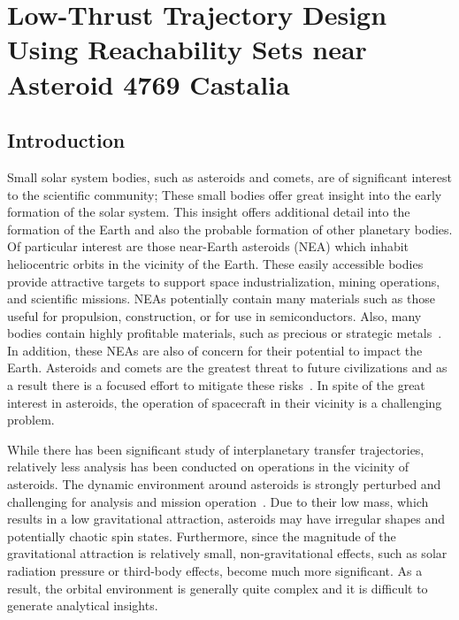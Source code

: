 
\chapter{Low-Thrust Trajectory Design Using Reachability Sets near Asteroid 4769 Castalia}



\section{Introduction}\label{sec:introduction}

Small solar system bodies, such as asteroids and comets, are of significant interest to the scientific community; These small bodies offer great insight into the early formation of the solar system.
This insight offers additional detail into the formation of the Earth and also the probable formation of other planetary bodies.
Of particular interest are those near-Earth asteroids (NEA) which inhabit heliocentric orbits in the vicinity of the Earth.
These easily accessible bodies provide attractive targets to support space industrialization, mining operations, and scientific missions.
NEAs potentially contain many materials such as those useful for propulsion, construction, or for use in semiconductors.
Also, many bodies contain highly profitable materials, such as precious or strategic metals~\cite{ross2001}.
In addition, these NEAs are also of concern for their potential to impact the Earth.
Asteroids and comets are the greatest threat to future civilizations and as a result there is a focused effort to mitigate these risks~\cite{wie2008}.
In spite of the great interest in asteroids, the operation of spacecraft in their vicinity is a challenging problem.

While there has been significant study of interplanetary transfer trajectories, relatively less analysis has been conducted on operations in the vicinity of asteroids.
The dynamic environment around asteroids is strongly perturbed and challenging for analysis and mission operation~\cite{scheeres1994,scheeres2000}.
Due to their low mass, which results in a low gravitational attraction, asteroids may have irregular shapes and potentially chaotic spin states.
Furthermore, since the magnitude of the gravitational attraction is relatively small, non-gravitational effects, such as solar radiation pressure or third-body effects, become much more significant.
As a result, the orbital environment is generally quite complex and it is difficult to generate analytical insights.

